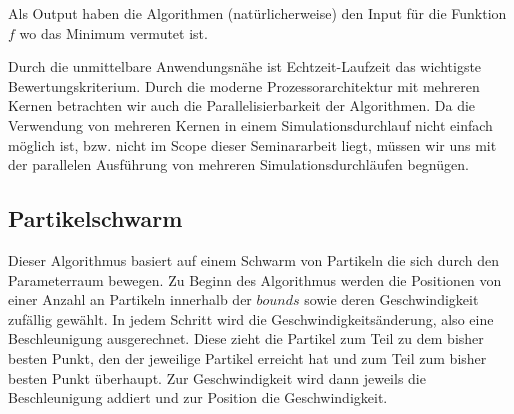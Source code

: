 \documentclass[a4paper,12pt]{article}
\begin{document}
Als Output haben die Algorithmen (natürlicherweise) den Input für die Funktion $f$ wo das Minimum vermutet ist. 

Durch die unmittelbare Anwendungsnähe ist Echtzeit-Laufzeit das wichtigste Bewertungskriterium. Durch die moderne Prozessorarchitektur mit mehreren Kernen betrachten wir auch die Parallelisierbarkeit der Algorithmen. Da die Verwendung von mehreren Kernen in einem Simulationsdurchlauf nicht einfach möglich ist, bzw. nicht im Scope dieser Seminararbeit liegt, müssen wir uns mit der parallelen Ausführung von mehreren Simulationsdurchläufen begnügen.

\subsection{Partikelschwarm \cite{kennedy_eberhart_1995}\cite{shi_eberhart_1998}}

Dieser Algorithmus basiert auf einem Schwarm von Partikeln die sich durch den Parameterraum bewegen. Zu Beginn des Algorithmus werden die Positionen von einer Anzahl an Partikeln innerhalb der $bounds$ sowie deren Geschwindigkeit zufällig gewählt. In jedem Schritt wird die Geschwindigkeitsänderung, also eine Beschleunigung ausgerechnet. Diese zieht die Partikel zum Teil zu dem bisher besten Punkt, den der jeweilige Partikel erreicht hat und zum Teil zum bisher besten Punkt überhaupt. Zur Geschwindigkeit wird dann jeweils die Beschleunigung addiert und zur Position die Geschwindigkeit. 
\end{document}
